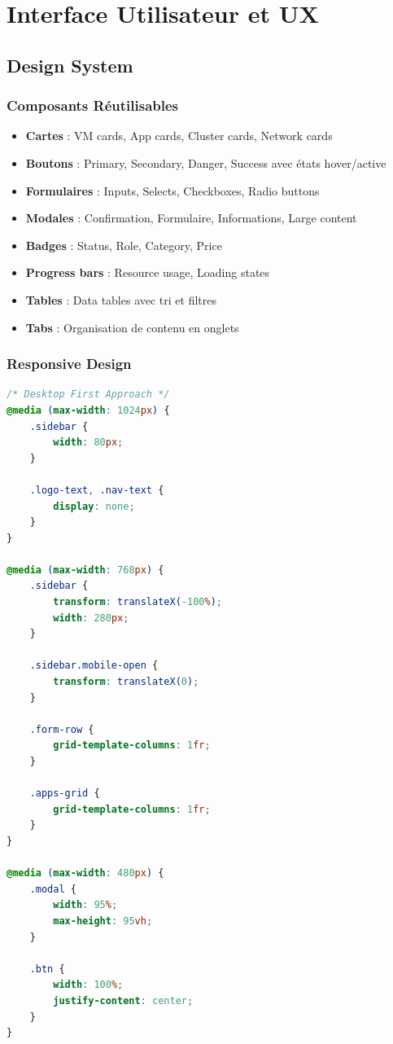 \documentclass[12pt,a4paper]{article}
\begin{document}
\section{Interface Utilisateur et UX}

\subsection{Design System}

\subsubsection{Composants Réutilisables}

\begin{successbox}
\begin{itemize}
    \item \textbf{Cartes} : VM cards, App cards, Cluster cards, Network cards
    \item \textbf{Boutons} : Primary, Secondary, Danger, Success avec états hover/active
    \item \textbf{Formulaires} : Inputs, Selects, Checkboxes, Radio buttons
    \item \textbf{Modales} : Confirmation, Formulaire, Informations, Large content
    \item \textbf{Badges} : Status, Role, Category, Price
    \item \textbf{Progress bars} : Resource usage, Loading states
    \item \textbf{Tables} : Data tables avec tri et filtres
    \item \textbf{Tabs} : Organisation de contenu en onglets
\end{itemize}
\end{successbox}

\subsubsection{Responsive Design}

\begin{lstlisting}[language=CSS,caption=Media queries (main.css)]
/* Desktop First Approach */
@media (max-width: 1024px) {
    .sidebar {
        width: 80px;
    }
    
    .logo-text, .nav-text {
        display: none;
    }
}

@media (max-width: 768px) {
    .sidebar {
        transform: translateX(-100%);
        width: 280px;
    }
    
    .sidebar.mobile-open {
        transform: translateX(0);
    }
    
    .form-row {
        grid-template-columns: 1fr;
    }
    
    .apps-grid {
        grid-template-columns: 1fr;
    }
}

@media (max-width: 480px) {
    .modal {
        width: 95%;
        max-height: 95vh;
    }
    
    .btn {
        width: 100%;
        justify-content: center;
    }
}
\end{lstlisting}
\end{document}
